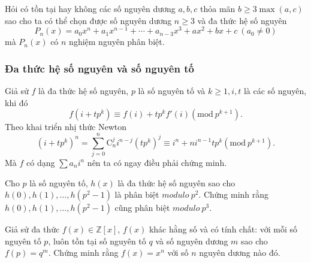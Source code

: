 \begin{bt} 
Hỏi có tồn tại hay không các số nguyên dương $a,b,c$ thỏa mãn $b \geq 3 \max (a,c)$ sao cho  ta có thể chọn được số nguyên dương $n \geq 3$ và đa thức hệ số nguyên 
$$P_n(x)=a_0x^n +a_1x^{n-1} + \cdots +a_{n-3}x^3+ax^2+bx+c ~ (a_0 \neq 0)$$
mà $P_n(x)$ có $n$ nghiệm nguyên phân biệt. 
\end{bt}
\subsubsection{Đa thức hệ số nguyên và số nguyên tố} 
\begin{bode} Giả sử $f$ là đa thức hệ số nguyên, $p$ là số nguyên tố và $k\geq 1,i,t$ là các số nguyên, khi đó 
	$$f(i+tp^k) \equiv f(i)+tp^kf'(i) \left ( \mathrm{mod~} p^{k+1}\right ).$$
Theo khai triển nhị thức Newton $$(i+tp^k)^n= \sum_{j=0}^n \mathrm{C}_n^ji^{n-j}\left (tp^k\right )^j \equiv i^n+ni^{n-1}tp^k \left ( \mathrm{mod~} p^{k+1}\right ).$$
Mà $f$ có dạng $\sum a_ni^n$ nên ta có ngay điều phải chứng minh.
\end{bode}

\begin{bt}
Cho $p$ là số nguyên tố, $h(x)$ là đa thức hệ số nguyên sao cho $h(0),h(1), \ldots, h\left (p^2-1\right )$  là phân biệt $modulo ~p^2$. Chứng minh rằng $h(0),h(1), \ldots, h\left (p^2-1\right )$ cũng phân biệt $modulo ~p^3$.
\end{bt}
\begin{bt}
Giả sử đa thức $f(x) \in  \mathbb{Z}[x]$, $f(x)$ khác hằng số và có tính chất: với mỗi số nguyên tố $p$, luôn tồn tại số nguyên tố $q$ và số nguyên dương $m$ sao cho $f(p)=q^m$. Chứng minh rằng $f(x)=x^n$ với số $n$ nguyên dương nào đó.
\end{bt}

